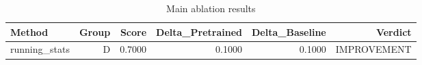 \begin{table}[htbp]
\centering
\caption{Main ablation results}
\label{tab:main-results}
\begin{tabular}{lrrrrr}
\toprule
\textbf{Method} & \textbf{Group} & \textbf{Score} & \textbf{Delta\_Pretrained} & \textbf{Delta\_Baseline} & \textbf{Verdict} \\
\midrule
running\_stats & D & 0.7000 & 0.1000 & 0.1000 & IMPROVEMENT \\
\bottomrule
\end{tabular}
\end{table}